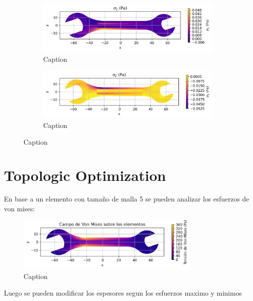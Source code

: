 \documentclass{article}  %
\begin{document}
\begin{figure}[H]
  \centering
  \begin{subfigure}[t]{0.49\textwidth}
    \centering
    \includegraphics[width=\textwidth]{GRAFICOS/Case d - sigma_1.png}
    \caption{Caption}
    \label{fig:deformada_reacciones}
  \end{subfigure}
  \hfill
  \begin{subfigure}[t]{0.49\textwidth}
    \centering
    \includegraphics[width=\textwidth]{GRAFICOS/Case d - sigma_2.png}
    \caption{Caption}
    \label{fig:von_mises}
  \end{subfigure}
  \caption{Caption}
  \label{fig:analisis_estructural}
\end{figure}

\section{Topologic Optimization}

En base a un elemento con tamaño de malla 5 se pueden analizar los esfuerzos de von mises:

\begin{figure}[H]
  \centering
  \includegraphics[width=0.8\textwidth]{GRAFICOS/Topo_ini_von_mises.png}
  \caption{Caption}
  \label{fig:deformada_reacciones}
\end{figure}

Luego se pueden modificar los espesores segun los esfuerzos maximo y minimos
\end{document}
